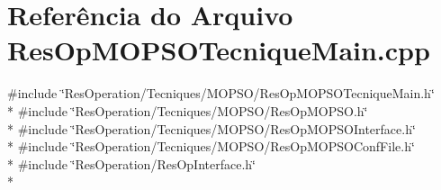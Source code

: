 \section{Referência do Arquivo Res\+Op\+M\+O\+P\+S\+O\+Tecnique\+Main.\+cpp}
\label{_tecniques_2_m_o_p_s_o_2_res_op_m_o_p_s_o_tecnique_main_8cpp}
{\ttfamily \#include \char`\"{}Res\+Operation/\+Tecniques/\+M\+O\+P\+S\+O/\+Res\+Op\+M\+O\+P\+S\+O\+Tecnique\+Main.\+h\char`\"{}}\\*
{\ttfamily \#include \char`\"{}Res\+Operation/\+Tecniques/\+M\+O\+P\+S\+O/\+Res\+Op\+M\+O\+P\+S\+O.\+h\char`\"{}}\\*
{\ttfamily \#include \char`\"{}Res\+Operation/\+Tecniques/\+M\+O\+P\+S\+O/\+Res\+Op\+M\+O\+P\+S\+O\+Interface.\+h\char`\"{}}\\*
{\ttfamily \#include \char`\"{}Res\+Operation/\+Tecniques/\+M\+O\+P\+S\+O/\+Res\+Op\+M\+O\+P\+S\+O\+Conf\+File.\+h\char`\"{}}\\*
{\ttfamily \#include \char`\"{}Res\+Operation/\+Res\+Op\+Interface.\+h\char`\"{}}\\*
